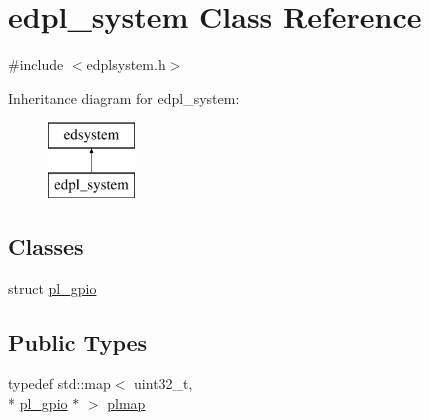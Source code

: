 \hypertarget{classedpl__system}{\section{edpl\-\_\-system Class Reference}
\label{classedpl__system}
}


{\ttfamily \#include $<$edplsystem.\-h$>$}

Inheritance diagram for edpl\-\_\-system\-:\begin{figure}[H]
\begin{center}
\leavevmode
\includegraphics[height=2.000000cm]{classedpl__system}
\end{center}
\end{figure}
\subsection*{Classes}
\begin{DoxyCompactItemize}
\item 
struct \hyperlink{structedpl__system_1_1pl__gpio}{pl\-\_\-gpio}
\end{DoxyCompactItemize}
\subsection*{Public Types}
\begin{DoxyCompactItemize}
\item 
typedef std\-::map$<$ uint32\-\_\-t, \\*
\hyperlink{structedpl__system_1_1pl__gpio}{pl\-\_\-gpio} $\ast$ $>$ \hyperlink{classedpl__system_ac6e43a24e97887c11e2e4d7c54294bc4}{plmap}
\end{DoxyCompactItemize}
